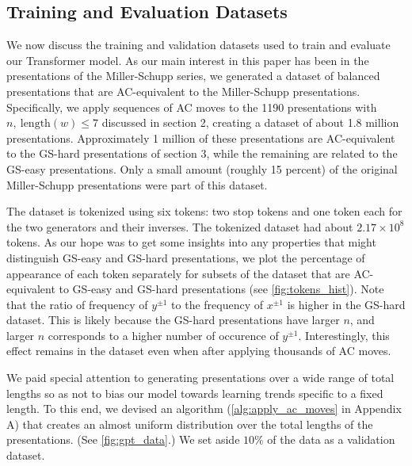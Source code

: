 \subsection{Training and Evaluation Datasets}

We now discuss the training and validation datasets used to train and evaluate our Transformer model. As our main interest in this paper has been in the presentations of the Miller-Schupp series, we generated a dataset of balanced presentations that are AC-equivalent to the Miller-Schupp presentations. Specifically, we apply sequences of AC moves to the 1190 presentations with $n,\ \text{length}(w) \leq 7$ discussed in section 2, creating a dataset of about 1.8 million presentations. Approximately 1 million of these presentations are AC-equivalent to the GS-hard presentations of section 3, while the remaining are related to the GS-easy presentations. 
Only a small amount (roughly 15 percent) of the original Miller-Schupp presentations were part of this dataset.

The dataset is tokenized using six tokens: two stop tokens and one token each for the two generators and their inverses. The tokenized dataset had about $2.17 \times 10^8$ tokens. As our hope was to get some insights into any properties that might distinguish GS-easy and GS-hard presentations, we plot the percentage of appearance of each token separately for subsets of the dataset that are AC-equivalent to GS-easy and GS-hard presentations (see \autoref{fig:tokens_hist}). 
Note that the ratio of frequency of $y^{\pm 1}$ to the frequency of $x^{\pm 1}$ is higher in the GS-hard dataset. This is likely because the GS-hard presentations have larger $n$, and larger $n$ corresponds to a higher number of occurence of $y^{\pm 1}$. Interestingly, this effect remains in the dataset even when after applying thousands of AC moves.

We paid special attention to generating presentations over a wide range of total lengths so as not to bias our model towards learning trends specific to a fixed length. To this end, we devised an algorithm (\autoref{alg:apply_ac_moves} in Appendix A) that creates an almost uniform distribution over the total lengths of the presentations. (See \autoref{fig:gpt_data}.) We set aside $10\%$ of the data as a validation dataset.

